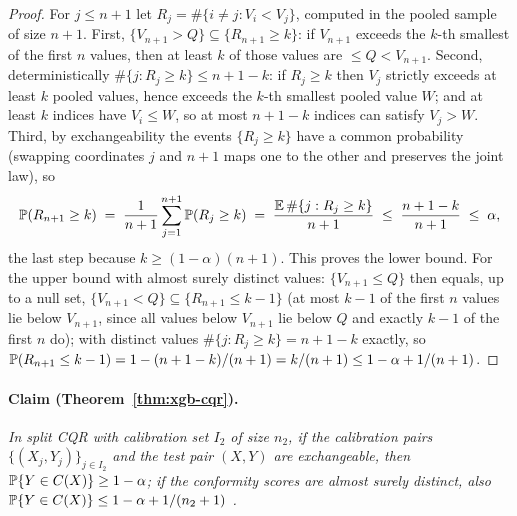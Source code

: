 \begin{proof}
For $j \le n+1$ let $R_j = \#\{i \ne j : V_i < V_j\}$, computed in the pooled sample of size $n+1$.
First, $\{V_{n+1} > Q\} \subseteq \{R_{n+1} \ge k\}$: if $V_{n+1}$ exceeds the $k$-th smallest of
the first $n$ values, then at least $k$ of those values are $\le Q < V_{n+1}$. Second,
deterministically $\#\{j : R_j \ge k\} \le n+1-k$: if $R_j \ge k$ then $V_j$ strictly exceeds at
least $k$ pooled values, hence exceeds the $k$-th smallest pooled value $W$; and at least $k$
indices have $V_i \le W$, so at most $n+1-k$ indices can satisfy $V_j > W$. Third, by
exchangeability the events $\{R_j \ge k\}$ have a common probability (swapping coordinates $j$ and
$n+1$ maps one to the other and preserves the joint law), so
\[
\mathbb{P}(R_{n+1} \ge k) \;=\; \frac{1}{n+1} \sum_{j=1}^{n+1} \mathbb{P}(R_j \ge k)
\;=\; \frac{\mathbb{E}\,\#\{j : R_j \ge k\}}{n+1} \;\le\; \frac{n+1-k}{n+1} \;\le\; \alpha ,
\]
the last step because $k \ge (1-\alpha)(n+1)$. This proves the lower bound. For the upper bound with
almost surely distinct values: $\{V_{n+1} \le Q\}$ then equals, up to a null set, $\{V_{n+1} < Q\}
\subseteq \{R_{n+1} \le k-1\}$ (at most $k-1$ of the first $n$ values lie below $V_{n+1}$, since all
values below $V_{n+1}$ lie below $Q$ and exactly $k-1$ of the first $n$ do); with distinct values
$\#\{j : R_j \ge k\} = n+1-k$ exactly, so $\mathbb{P}(R_{n+1} \le k-1) = 1 - (n+1-k)/(n+1) = k/(n+1) \le
1-\alpha+1/(n+1)$.
\end{proof}

\paragraph{Claim (Theorem~\ref{thm:xgb-cqr}).}
\emph{In split CQR with calibration set $I_2$ of size $n_2$, if the calibration pairs $\{(X_j,
Y_j)\}_{j \in I_2}$ and the test pair $(X, Y)$ are exchangeable, then $\mathbb{P}\{Y \in C(X)\} \ge 1 -
\alpha$; if the conformity scores are almost surely distinct, also $\mathbb{P}\{Y \in C(X)\} \le 1 -
\alpha + 1/(n_2+1)$ \cite{romano2019}.}

